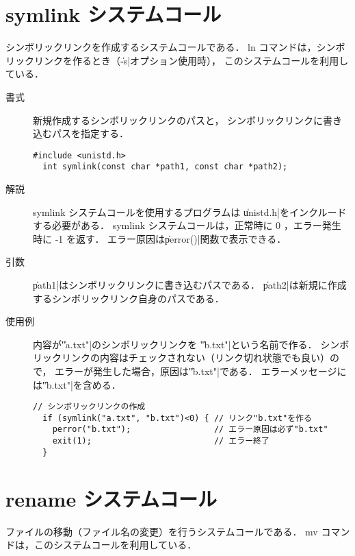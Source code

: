 \section{symlink システムコール}

シンボリックリンクを作成するシステムコールである．
ln コマンドは，シンボリックリンクを作るとき（\|-s|オプション使用時），
このシステムコールを利用している．

\begin{description}
\item[書式] 新規作成するシンボリックリンクのパスと，
シンボリックリンクに書き込むパスを指定する．
\begin{lstlisting}[numbers=none]
  #include <unistd.h>
  int symlink(const char *path1, const char *path2);
\end{lstlisting}

\item[解説] symlink システムコールを使用するプログラムは
\|unistd.h|をインクルードする必要がある．
symlink システムコールは，正常時に 0 ，エラー発生時に -1 を返す．
エラー原因は\|perror()|関数で表示できる．

\item[引数] \|path1|はシンボリックリンクに書き込むパスである．
\|path2|は新規に作成するシンボリックリンク自身のパスである．

\item[使用例] 内容が\|"a.txt"|のシンボリックリンクを
\|"b.txt"|という名前で作る．
シンボリックリンクの内容はチェックされない（リンク切れ状態でも良い）ので，
エラーが発生した場合，原因は\|"b.txt"|である．
エラーメッセージには\|"b.txt"|を含める．
\begin{lstlisting}[numbers=none]
  // シンボリックリンクの作成
  if (symlink("a.txt", "b.txt")<0) { // リンク"b.txt"を作る
    perror("b.txt");                 // エラー原因は必ず"b.txt"
    exit(1);                         // エラー終了
  }
\end{lstlisting}
\end{description}

\section{rename システムコール}
ファイルの移動（ファイル名の変更）を行うシステムコールである．
mv コマンドは，このシステムコールを利用している．

